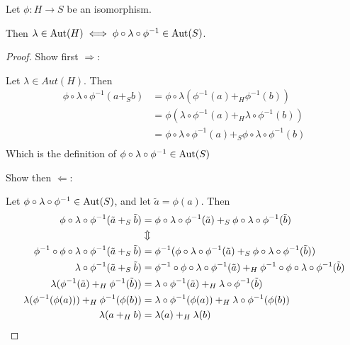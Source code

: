 \begin{theorem} \label{thm:conjugacy-automorphism}
    Let \( \phi: H \to S \) be an isomorphism.

    Then \( \lambda \in \operatorname{Aut}(H) \iff \phi \circ \lambda \circ \phi^{-1} \in \operatorname{Aut}(S) \).
\end{theorem}
\begin{proof}
    Show first \( \Rightarrow \):

    Let \( \lambda \in Aut(H) \). Then
    \begin{align*}
        \phi \circ \lambda \circ \phi^{-1} (a +_S b) &= \phi \circ \lambda(\phi^{-1}(a) +_H \phi^{-1}(b)) \\
        &= \phi(\lambda \circ \phi^{-1}(a) +_H \lambda \circ \phi^{-1}(b)) \\
        &= \phi \circ \lambda \circ \phi^{-1}(a) +_S \phi \circ \lambda \circ \phi^{-1}(b) \\
    \end{align*}
    Which is the definition of \( \phi \circ \lambda \circ \phi^{-1} \in \operatorname{Aut}(S) \)

    Show then \( \Leftarrow \):

    Let \( \phi \circ \lambda \circ \phi^{-1} \in \operatorname{Aut}(S) \), and let \( \tilde{a} = \phi(a) \). Then
    \begin{align*}
        \phi \circ \lambda \circ \phi^{-1} (\tilde{a} +_S \tilde{b}) &= \phi \circ \lambda \circ \phi^{-1}(\tilde{a}) +_S \phi \circ \lambda \circ \phi^{-1}(\tilde{b}) \\
        &\Updownarrow \\
        \phi^{-1} \circ \phi \circ \lambda \circ \phi^{-1} (\tilde{a} +_S \tilde{b}) &= \phi^{-1}(\phi \circ \lambda \circ \phi^{-1}(\tilde{a}) +_S \phi \circ \lambda \circ \phi^{-1}(\tilde{b})) \\
        \lambda \circ \phi^{-1} (\tilde{a} +_S \tilde{b}) &= \phi^{-1} \circ \phi \circ \lambda \circ \phi^{-1} (\tilde{a}) +_H \phi^{-1} \circ \phi \circ \lambda \circ \phi^{-1} (\tilde{b}) \\
        \lambda(\phi^{-1}(\tilde{a}) +_H \phi^{-1}(\tilde{b})) &= \lambda \circ \phi^{-1} (\tilde{a}) +_H \lambda \circ \phi^{-1} (\tilde{b}) \\
        \lambda(\phi^{-1}(\phi(a))) +_H \phi^{-1}(\phi(b)) &= \lambda \circ \phi^{-1} (\phi(a)) +_H \lambda \circ \phi^{-1} (\phi(b)) \\
        \lambda(a +_H b) &= \lambda(a) +_H \lambda(b) \qedhere
    \end{align*}
\end{proof}

